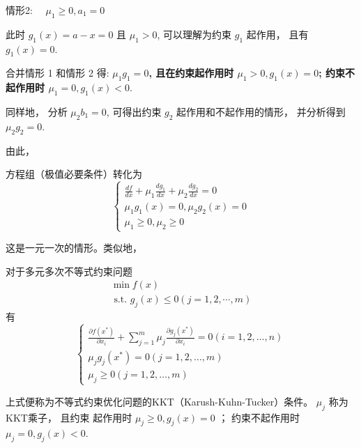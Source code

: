 情形2: $\quad \mu_{1} \geq 0, a_{1}=0$

此时 $g_{1}(x)=a-x=0$ 且 $\mu_{1}>0$, 可以理解为约束 $g_{1}$ 起作用， 且有 $g_{1}(x)=0$.

合并情形 1 和情形 2 得: \textbf{$\mu_{1} g_{1}=0$, 且在约束起作用时 $\mu_{1}>0, g_{1}(x)=0$; 约束不起作用时 $\mu_{1}=0, g_{1}(x)<0 .$}

同样地， 分析 $\mu_{2} b_{1}=0$, 可得出约束 $g_{2}$ 起作用和不起作用的情形， 并分析得到 $\mu_{2} g_{2}=0$.

由此， 
\begin{theorem}[一元一次优化式的KKT条件]
    方程组（极值必要条件）转化为
\begin{equation}
\left\{\begin{array}{l}
\frac{d f}{d x}+\mu_{1} \frac{d g_{1}}{d x}+\mu_{2} \frac{d g_{2}}{d x}=0 \\
\mu_{1} g_{1}(x)=0, \mu_{2} g_{2}(x)=0 \\
\mu_{1} \geq 0, \mu_{2} \geq 0
\end{array}\right.
\end{equation}

\end{theorem}

 这是一元一次的情形。类似地， 

\begin{corollary}
    对于多元多次不等式约束问题
\begin{equation}
\begin{array}{l}
\min f({x}) \\
\text { s.t. } g_{j}({x}) \leq 0(j=1,2, \cdots, m)
\end{array}
\end{equation}
有
\begin{equation}
\left\{\begin{array}{l}
\frac{\partial f\left(x^{*}\right)}{\partial x_{i}}+\sum_{j=1}^{m} \mu_{j} \frac{\partial g_{j}\left(x^{*}\right)}{\partial x_{i}}=0(i=1,2, \ldots, n) \\
\mu_{j} g_{j}\left(x^{*}\right)=0(j=1,2, \ldots, m) \\
\mu_{j} \geq 0(j=1,2, \ldots, m)
\end{array}\right.
\end{equation}

上式便称为不等式约束优化问题的KKT（Karush-Kuhn-Tucker）条件。 $ \mu_{j} $ 称为KKT乘子， 且约束 起作用时 $ \mu_{j} \geq 0, g_{j}(x)=0 $ ； 约束不起作用时 $ \mu_{j}=0, g_{j}(x)<0 $.
\end{corollary}

